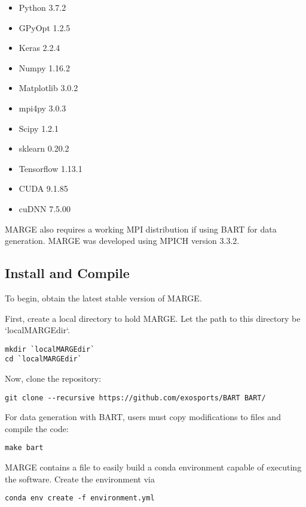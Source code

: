 \documentclass[letterpaper, 12pt]{article}
\begin{document}
\begin{itemize}
\item Python 3.7.2
\item GPyOpt 1.2.5
\item Keras 2.2.4
\item Numpy 1.16.2
\item Matplotlib 3.0.2
\item mpi4py 3.0.3
\item Scipy 1.2.1
\item sklearn 0.20.2
\item Tensorflow 1.13.1
\item CUDA 9.1.85
\item cuDNN 7.5.00
\end{itemize}

\noindent MARGE also requires a working MPI distribution if using BART for 
data generation.  MARGE was developed using MPICH version 3.3.2.



\subsection{Install and Compile}
\label{sec:install}

\noindent To begin, obtain the latest stable version of MARGE.  

\noindent First, create a local directory to hold MARGE.  Let the path to this directory 
be `localMARGEdir`.

\begin{verbatim}
mkdir `localMARGEdir`
cd `localMARGEdir`
\end{verbatim}

\noindent Now, clone the repository:
\begin{verbatim}
git clone --recursive https://github.com/exosports/BART BART/
\end{verbatim}

\noindent For data generation with BART, users must copy modifications to files
and compile the code:

\begin{verbatim}
make bart
\end{verbatim}

\noindent MARGE contains a file to easily build a conda environment capable of 
executing the software.  Create the environment via

\begin{verbatim}
conda env create -f environment.yml
\end{verbatim}
\end{document}
